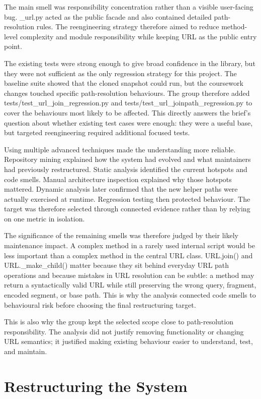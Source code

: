 \documentclass[11pt,a4paper]{article}
\begin{document}
The main smell was responsibility concentration rather than a visible user-facing bug. \_url.py acted as the public facade and also contained detailed path-resolution rules. The reengineering strategy therefore aimed to reduce method-level complexity and module responsibility while keeping URL as the public entry point.


The existing tests were strong enough to give broad confidence in the library, but they were not sufficient as the only regression strategy for this project. The baseline suite showed that the cloned snapshot could run, but the coursework changes touched specific path-resolution behaviours. The group therefore added tests/test\_url\_join\_regression.py and tests/test\_url\_joinpath\_regression.py to cover the behaviours most likely to be affected. This directly answers the brief's question about whether existing test cases were enough: they were a useful base, but targeted reengineering required additional focused tests.


Using multiple advanced techniques made the understanding more reliable. Repository mining explained how the system had evolved and what maintainers had previously restructured. Static analysis identified the current hotspots and code smells. Manual architecture inspection explained why those hotspots mattered. Dynamic analysis later confirmed that the new helper paths were actually exercised at runtime. Regression testing then protected behaviour. The target was therefore selected through connected evidence rather than by relying on one metric in isolation.


The significance of the remaining smells was therefore judged by their likely maintenance impact. A complex method in a rarely used internal script would be less important than a complex method in the central URL class. URL.join() and URL.\_make\_child() matter because they sit behind everyday URL path operations and because mistakes in URL resolution can be subtle: a method may return a syntactically valid URL while still preserving the wrong query, fragment, encoded segment, or base path. This is why the analysis connected code smells to behavioural risk before choosing the final restructuring target.


This is also why the group kept the selected scope close to path-resolution responsibility. The analysis did not justify removing functionality or changing URL semantics; it justified making existing behaviour easier to understand, test, and maintain.


\section*{Restructuring the System}
\end{document}

